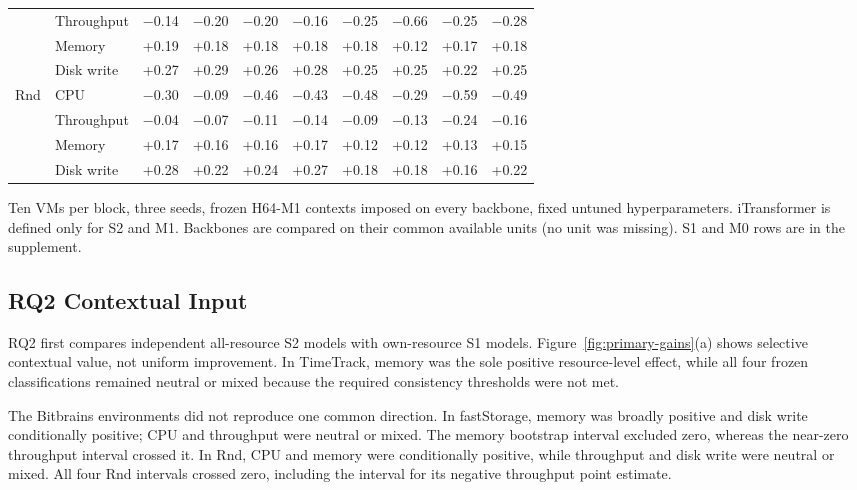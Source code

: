 \documentclass[5p,twocolumn]{elsarticle}
\begin{document}
\begin{table}[t]
\begin{tabular*}{\textwidth}{@{\extracolsep{\fill}}llrrrrrrrr@{}}
     & Throughput & $-$0.14 & $-$0.20 & $-$0.20 & $-$0.16 & $-$0.25 & $-$0.66 & $-$0.25 & $-$0.28 \\
     & Memory & +0.19 & +0.18 & +0.18 & +0.18 & +0.18 & +0.12 & +0.17 & +0.18 \\
     & Disk write & +0.27 & +0.29 & +0.26 & +0.28 & +0.25 & +0.25 & +0.22 & +0.25 \\
    Rnd & CPU & $-$0.30 & $-$0.09 & $-$0.46 & $-$0.43 & $-$0.48 & $-$0.29 & $-$0.59 & $-$0.49 \\
     & Throughput & $-$0.04 & $-$0.07 & $-$0.11 & $-$0.14 & $-$0.09 & $-$0.13 & $-$0.24 & $-$0.16 \\
     & Memory & +0.17 & +0.16 & +0.16 & +0.17 & +0.12 & +0.12 & +0.13 & +0.15 \\
     & Disk write & +0.28 & +0.22 & +0.24 & +0.27 & +0.18 & +0.18 & +0.16 & +0.22 \\
    \bottomrule
  \end{tabular*}

  \vspace{2pt}
  \parbox{\textwidth}{\footnotesize Ten VMs per block, three seeds, frozen H64-M1 contexts imposed on every backbone, fixed untuned hyperparameters. iTransformer is defined only for S2 and M1. Backbones are compared on their common available units (no unit was missing). S1 and M0 rows are in the supplement.}
\end{table}


\subsection{RQ2 Contextual Input}
\label{sec:results-rq1}

RQ2 first compares independent all-resource S2 models with own-resource
S1 models. Figure~\ref{fig:primary-gains}(a) shows selective
contextual value, not uniform improvement. In TimeTrack, memory was the sole
positive resource-level effect, while all four frozen classifications remained
neutral or mixed because the required consistency thresholds were not met.

The Bitbrains environments did not reproduce one common direction. In
fastStorage, memory was broadly positive and disk write conditionally positive;
CPU and throughput were neutral or mixed. The memory bootstrap interval
excluded zero, whereas the near-zero throughput interval crossed it. In Rnd,
CPU and memory were conditionally positive, while throughput and disk write
were neutral or mixed. All four Rnd intervals crossed zero, including the
interval for its negative throughput point estimate.
\end{document}

